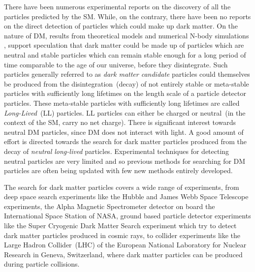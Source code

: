 \par
 There have been numerous experimental reports on the discovery of all the particles predicted by the SM. While, on the contrary, there have been no reports on the direct detection of particles which could make up dark matter. On the nature of DM, results from theoretical models and numerical N-body simulations \cite{DMS}, support speculation that dark matter could be made up of particles which are neutral and stable \ie particles which can remain stable enough for a long period of time comparable to the age of our universe, before they disintegrate. Such particles generally referred to as \textit{dark matter candidate} particles could themselves be produced from the disintegration~(decay) of not entirely stable or meta-stable particles with sufficiently long lifetimes on the length scale of a particle detector  particles\cite{SUSYDM}. These meta-stable particles with sufficiently long lifetimes are called \textit{Long-Lived}~(LL) particles. LL particles can either be charged or neutral~(\ie in the context of the SM, carry no net charge). There is significant interest towards neutral DM particles, since DM does not interact with light. A good amount of effort is directed towards the search for dark matter particles produced from the decay of \textit{neutral long-lived} particles\cite{LSPDM}. Experimental techniques for detecting neutral particles are very limited and so previous methods for searching for DM particles are often being updated with few new methods entirely developed.  %
\par
   The search for dark matter particles covers a wide range of experiments, from deep space search experiments like the Hubble and James Webb Space Telescope experiments, the Alpha Magnetic Spectrometer detector on board the International Space Station of NASA, ground based particle detector experiments like the Super Cryogenic Dark Matter Search experiment which try to detect dark matter particles produced in cosmic rays, to collider experiments like the Large Hadron Collider~(LHC) of the European National Laboratory for Nuclear Research in Geneva, Switzerland, where dark matter particles can be produced during particle collisions.
